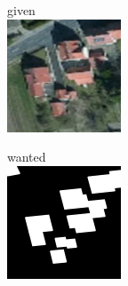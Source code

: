 \documentclass[12pt,a4paper]{article}
\begin{document}
    \begin{center}
        \begin{minipage}{0.3\textwidth}
            \centering given 
            \\
            \includegraphics[width=\textwidth]{from_josm/rosdorf/examples/image_3DJFEM}
        \end{minipage}
        \qquad
        \begin{minipage}{0.3\textwidth}
            \centering wanted 
            \\
            \includegraphics[width=\textwidth]{from_josm/rosdorf/examples/label_3DJFEM}
        \end{minipage}
    \end{center}
    
\end{document}
